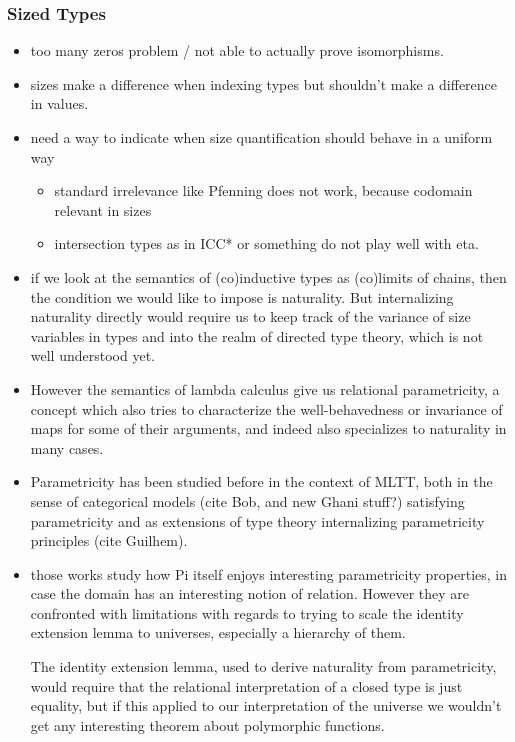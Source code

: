 \documentclass{book}
\begin{document}
\subsubsection{Sized Types}
\begin{itemize}
    \item too many zeros problem / not able to actually prove isomorphisms.
    \item sizes make a difference when indexing types but shouldn't make a difference in values.
    \item need a way to indicate when size quantification should behave in a uniform way
      \begin{itemize}
      \item standard irrelevance like Pfenning does not work, because codomain relevant in sizes
      \item intersection types as in ICC* or something do not play well with eta.
      \end{itemize}

    \item if we look at the semantics of (co)inductive types as (co)limits
    of chains, then the condition we would like to impose is
    naturality. But internalizing naturality directly would require us
    to keep track of the variance of size variables in types and into
    the realm of directed type theory, which is not well understood
    yet.

    \item However the semantics of lambda calculus give us relational
    parametricity, a concept which also tries to characterize the
    well-behavedness or invariance of maps for some of their
    arguments, and indeed also specializes to naturality in many cases.

    \item Parametricity has been studied before in the context of MLTT,
    both in the sense of categorical models (cite Bob, and new Ghani
    stuff?) satisfying parametricity and as extensions of type theory
    internalizing parametricity principles (cite Guilhem).

    \item those works study how Pi itself enjoys interesting parametricity
    properties, in case the domain has an interesting notion of
    relation. However they are confronted with limitations with
    regards to trying to scale the identity extension lemma to
    universes, especially a hierarchy of them.

    The identity extension lemma, used to derive naturality from
    parametricity, would require that the relational interpretation of
    a closed type is just equality, but if this applied to our
    interpretation of the universe we wouldn't get any interesting
    theorem about polymorphic functions.


\end{itemize}
\end{document}
